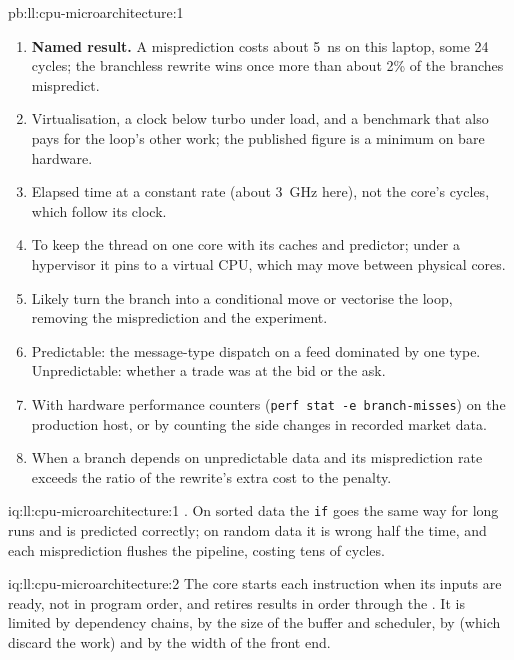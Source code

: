 \begin{solution}{pb:ll:cpu-microarchitecture:1}
\begin{enumerate}
to learn.
\item \textbf{Named result.} A misprediction costs about \qty{5}{\nano\second} on this laptop, some 24 cycles; the
branchless rewrite wins once more than about 2\% of the branches mispredict.
\item Virtualisation, a clock below turbo under load, and a benchmark that also pays for the loop's other work; the
published figure is a minimum on bare hardware.
\item Elapsed time at a constant rate (about 3~GHz here), not the core's cycles, which follow its clock.
\item To keep the thread on one core with its caches and predictor; under a hypervisor it pins to a virtual CPU,
which may move between physical cores.
\item Likely turn the branch into a conditional move or vectorise the loop, removing the misprediction and the
experiment.
\item Predictable: the message-type dispatch on a feed dominated by one type. Unpredictable: whether a trade was at the
bid or the ask.
\item With hardware performance counters (\texttt{perf stat -e branch-misses}) on the production host, or by counting
the side changes in recorded market data.
\item When a branch depends on unpredictable data and its misprediction rate exceeds the ratio of the rewrite's extra
cost to the penalty.
\end{enumerate}
\end{solution}

\begin{solution}{iq:ll:cpu-microarchitecture:1}
. On sorted data the \texttt{if} goes the same way for long runs and is predicted correctly; on random
data it is wrong half the time, and each misprediction flushes the pipeline, costing tens of cycles.
\end{solution}

\begin{solution}{iq:ll:cpu-microarchitecture:2}
The core starts each instruction when its inputs are ready, not in program order, and retires results in order through
the . It is limited by dependency chains, by the size of the buffer and scheduler, by  (which discard the work) and by the width of the front end.
\end{solution}

